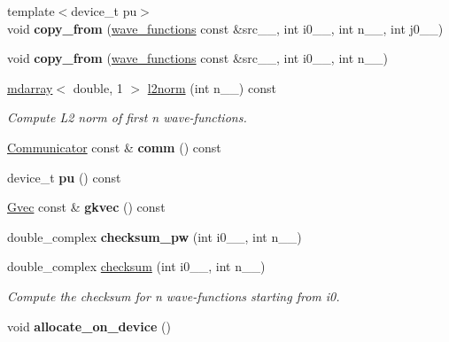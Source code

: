 \begin{DoxyCompactItemize}
\item 
\hypertarget{classsddk_1_1wave__functions_a9d5ddbb2fd84b6faf9bcd2dd172df64a}{}{\footnotesize template$<$device\+\_\+t pu$>$ }\\void {\bfseries copy\+\_\+from} (\hyperlink{classsddk_1_1wave__functions}{wave\+\_\+functions} const \&src\+\_\+\+\_\+, int i0\+\_\+\+\_\+, int n\+\_\+\+\_\+, int j0\+\_\+\+\_\+)\label{classsddk_1_1wave__functions_a9d5ddbb2fd84b6faf9bcd2dd172df64a}

\item 
\hypertarget{classsddk_1_1wave__functions_afcb53190cf1ed8f1553deb8cc99993da}{}void {\bfseries copy\+\_\+from} (\hyperlink{classsddk_1_1wave__functions}{wave\+\_\+functions} const \&src\+\_\+\+\_\+, int i0\+\_\+\+\_\+, int n\+\_\+\+\_\+)\label{classsddk_1_1wave__functions_afcb53190cf1ed8f1553deb8cc99993da}

\item 
\hyperlink{classsddk_1_1mdarray}{mdarray}$<$ double, 1 $>$ \hyperlink{classsddk_1_1wave__functions_a4396e4bc7c9cec0952bbba10bc822814}{l2norm} (int n\+\_\+\+\_\+) const 
\begin{DoxyCompactList}\small\item\em Compute L2 norm of first n wave-\/functions. \end{DoxyCompactList}\item 
\hypertarget{classsddk_1_1wave__functions_a52e0f785c4cfa16d401b24743f288a79}{}\hyperlink{classsddk_1_1_communicator}{Communicator} const \& {\bfseries comm} () const \label{classsddk_1_1wave__functions_a52e0f785c4cfa16d401b24743f288a79}

\item 
\hypertarget{classsddk_1_1wave__functions_a6cc996e1311ec76ae12875bcf928e14c}{}device\+\_\+t {\bfseries pu} () const \label{classsddk_1_1wave__functions_a6cc996e1311ec76ae12875bcf928e14c}

\item 
\hypertarget{classsddk_1_1wave__functions_ab0e3cd6dd95856f8add2a6afe9f59152}{}\hyperlink{classsddk_1_1_gvec}{Gvec} const \& {\bfseries gkvec} () const \label{classsddk_1_1wave__functions_ab0e3cd6dd95856f8add2a6afe9f59152}

\item 
\hypertarget{classsddk_1_1wave__functions_a92c0ca284d15ea3d1414e74bad542b1f}{}double\+\_\+complex {\bfseries checksum\+\_\+pw} (int i0\+\_\+\+\_\+, int n\+\_\+\+\_\+)\label{classsddk_1_1wave__functions_a92c0ca284d15ea3d1414e74bad542b1f}

\item 
double\+\_\+complex \hyperlink{classsddk_1_1wave__functions_a420e3b189e0a3c13b0de992cbc0afda5}{checksum} (int i0\+\_\+\+\_\+, int n\+\_\+\+\_\+)
\begin{DoxyCompactList}\small\item\em Compute the checksum for n wave-\/functions starting from i0. \end{DoxyCompactList}\item 
\hypertarget{classsddk_1_1wave__functions_a4c8c71ac0a8e632ea61a50115f6c19fe}{}void {\bfseries allocate\+\_\+on\+\_\+device} ()\label{classsddk_1_1wave__functions_a4c8c71ac0a8e632ea61a50115f6c19fe}


\end{DoxyCompactItemize}
